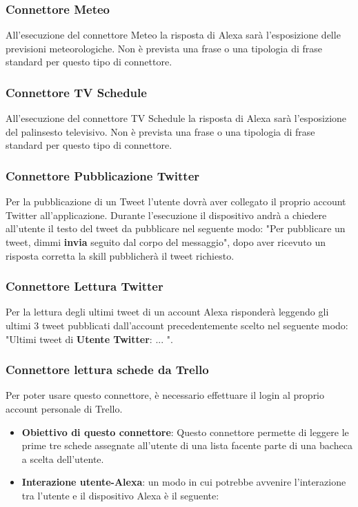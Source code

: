 \subsubsection{Connettore Meteo}
All'esecuzione del connettore Meteo la risposta di Alexa sarà l'esposizione delle previsioni meteorologiche. Non è prevista una frase o una tipologia di frase standard per questo tipo di connettore.
\subsubsection{Connettore TV Schedule}
All'esecuzione del connettore TV Schedule la risposta di Alexa sarà l'esposizione del palinsesto televisivo. Non è prevista una frase o una tipologia di frase standard per questo tipo di connettore.
\subsubsection{Connettore Pubblicazione Twitter}
Per la pubblicazione di un Tweet l'utente dovrà aver collegato il proprio account Twitter all'applicazione.
Durante l'esecuzione il dispositivo andrà a chiedere all'utente il testo del tweet da pubblicare nel seguente modo: "Per pubblicare un tweet, dimmi \textbf{invia} seguito dal corpo del messaggio", dopo aver ricevuto un risposta corretta la skill pubblicherà il tweet richiesto.
\subsubsection{Connettore Lettura Twitter}
Per la lettura degli ultimi tweet di un account Alexa risponderà leggendo gli ultimi 3 tweet pubblicati dall'account precedentemente scelto nel seguente modo: "Ultimi tweet di \textbf{Utente Twitter}: ... ".
\subsubsection{Connettore lettura schede da Trello}
Per poter usare questo connettore, è necessario effettuare il login al proprio account personale di Trello.
\begin{itemize}
	\item \textbf{Obiettivo di questo connettore}: Questo connettore permette di leggere le prime tre schede assegnate all'utente di una lista facente parte di una bacheca a scelta dell'utente.
	\item \textbf{Interazione utente-Alexa}: un modo in cui potrebbe avvenire l'interazione tra l'utente e il dispositivo Alexa è il seguente:
	
\end{itemize}



